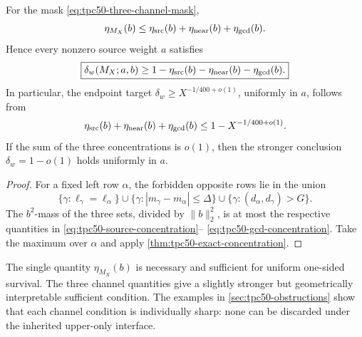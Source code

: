 \begin{proposition}
\label{prop:tpc50-three-channel-concentration}
For the mask \eqref{eq:tpc50-three-channel-mask},
\begin{equation}
 \eta_{M_X}(b)
 \le
 \eta_{\rm src}(b)
 +\eta_{\rm near}(b)
 +\eta_{\rm gcd}(b).
 \label{eq:tpc50-channel-union-bound}
\end{equation}
Hence every nonzero source weight \(a\) satisfies
\begin{equation}
 \boxed{
 \delta_w(M_X;a,b)
 \ge
 1-\eta_{\rm src}(b)
   -\eta_{\rm near}(b)
   -\eta_{\rm gcd}(b).}
 \label{eq:tpc50-channel-survival-bound}
\end{equation}
In particular, the endpoint target
\(\delta_w\ge X^{-1/400+o(1)}\), uniformly in \(a\), follows from
\begin{equation}
 \eta_{\rm src}(b)+\eta_{\rm near}(b)+\eta_{\rm gcd}(b)
 \le1-X^{-1/400+o(1)}.
 \label{eq:tpc50-minimal-checkable-endpoint}
\end{equation}
If the sum of the three concentrations is \(o(1)\), then the stronger
conclusion \(\delta_w=1-o(1)\) holds uniformly in \(a\).
\end{proposition}

\begin{proof}
For a fixed left row \(\alpha\), the forbidden opposite rows lie in
the union
\begin{equation}
 \{\gamma:\ell_\gamma=\ell_\alpha\}
 \cup
 \{\gamma:|m_\gamma-m_\alpha|\le\Delta\}
 \cup
 \{\gamma:(d_\alpha,d_\gamma)>G\}.
 \label{eq:tpc50-forbidden-union}
\end{equation}
The \(b^2\)-mass of the three sets, divided by \(\|b\|_2^2\), is at
most the respective quantities in
\eqref{eq:tpc50-source-concentration}--
\eqref{eq:tpc50-gcd-concentration}.  Take the maximum over \(\alpha\)
and apply \cref{thm:tpc50-exact-concentration}.
\end{proof}

\begin{remark}
\label{rem:tpc50-minimal-versus-channel}
The single quantity \(\eta_{M_X}(b)\) is necessary and sufficient for
uniform one-sided survival.  The three channel quantities give a
slightly stronger but geometrically interpretable sufficient
condition.  The examples in \cref{sec:tpc50-obstructions} show
that each channel condition is individually sharp: none can be
discarded under the inherited upper-only interface.
\end{remark}
